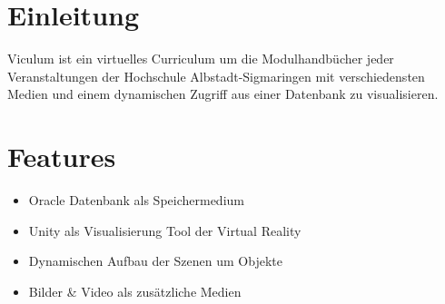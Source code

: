 \documentclass[a0,portrait]{a0poster}
\begin{document}
\begin{multicols}{2} %




\section*{\huge Einleitung}

{\LARGE Viculum ist ein virtuelles Curriculum um die Modulhandbücher jeder Veranstaltungen der Hochschule Albstadt-Sigmaringen mit verschiedensten Medien und einem dynamischen Zugriff aus einer Datenbank zu visualisieren.\\}

\vspace{1cm} %
\color{Black} %

\section*{\huge Features}

\begin{itemize}
\item {\LARGE Oracle Datenbank als Speichermedium}
\item {\LARGE Unity als Visualisierung Tool der Virtual Reality}
\item {\LARGE Dynamischen Aufbau der Szenen um Objekte}
\item {\LARGE Bilder \& Video als zusätzliche Medien}
\end{itemize}


\vspace{1cm} %

\end{multicols}
\end{document}
